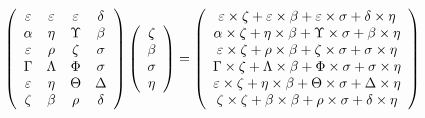 \documentclass[12pt]{article}
\begin{document}
$  %
 \left( \begin{array}
 {
 c
 c
 c
 c
 }
 \varepsilon & 
 \varepsilon & 
 \varepsilon & 
 \delta \\ 
 \alpha & 
 \eta & 
 \Upsilon & 
 \beta \\ 
 \varepsilon & 
 \rho & 
                    \zeta & 
 \sigma \\ 
 \Gamma & 
 \Lambda & 
 \Phi & 
 \sigma \\ 
 \varepsilon & 
 \eta & 
 \Theta & 
 \Delta \\ 
                    \zeta & 
 \beta & 
 \rho & 
 \delta
 \end{array} \right)
 \left( \begin{array}
 {
 c
 }
                    \zeta \\ 
 \beta \\ 
 \sigma \\ 
 \eta
 \end{array} \right)
=
 \left( \begin{array}
 {
 c
 }
  \varepsilon \times                     \zeta +  \varepsilon \times  \beta +  \varepsilon \times  \sigma +  \delta \times  \eta \\ 
  \alpha \times                     \zeta +  \eta \times  \beta +  \Upsilon \times  \sigma +  \beta \times  \eta \\ 
  \varepsilon \times                     \zeta +  \rho \times  \beta +                     \zeta \times  \sigma +  \sigma \times  \eta \\ 
  \Gamma \times                     \zeta +  \Lambda \times  \beta +  \Phi \times  \sigma +  \sigma \times  \eta \\ 
  \varepsilon \times                     \zeta +  \eta \times  \beta +  \Theta \times  \sigma +  \Delta \times  \eta \\ 
                     \zeta \times                     \zeta +  \beta \times  \beta +  \rho \times  \sigma +  \delta \times  \eta
 \end{array} \right)
$
 
 
 
 
 
\noindent{}

 
 
   
   
 \vspace{0.2in}
 
   
   
   
   
\end{document}
